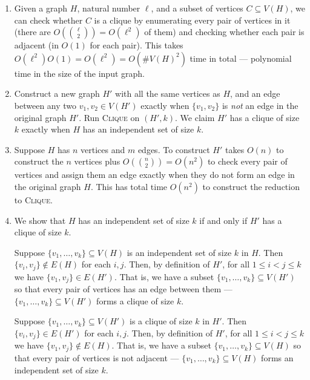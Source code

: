 \documentclass[12 pt, letterpaper]{hmcpset}
\begin{document}
\begin{solution}
	\begin{enumerate}
		\item Given a graph $H$, natural number $\ell$, and a subset of vertices $C \subseteq V(H)$, we can check whether $C$ is a clique by enumerating every pair of vertices in it (there are $O(\binom{\ell}{2}) = O(\ell^{2})$ of them) and checking whether each pair is adjacent (in $O(1)$ for each pair). This takes $O(\ell^{2}) O(1) = O(\ell^{2}) = O(\# V(H)^{2})$ time in total --- polynomial time in the size of the input graph.

		\item Construct a new graph $H'$ with all the same vertices as $H$, and an edge between any two $v_{1}, v_{2} \in V(H')$ exactly when $\{v_{1}, v_{2}\}$ is \emph{not} an edge in the original graph $H'$. Run \textsc{Clique} on $(H', k)$. We claim $H'$ has a clique of size $k$ exactly when $H$ has an independent set of size $k$.

		\item Suppose $H$ has $n$ vertices and $m$ edges. To construct $H'$ takes $O(n)$ to construct the $n$ vertices plus $O(\binom{n}{2}) = O(n^{2})$ to check every pair of vertices and assign them an edge exactly when they do not form an edge in the original graph $H$. This has total time $O(n^{2})$ to construct the reduction to \textsc{Clique}.

		\item We show that $H$ has an independent set of size $k$ if and only if $H'$ has a clique of size $k$. 

			Suppose $\{ v_{1}, \dots, v_{k} \} \subseteq V(H)$ is an independent set of size $k$ in $H$. Then $\{ v_{i}, v_{j} \} \notin E(H)$ for each $i, j$. Then, by definition of $H'$, for all $1 \le i < j \le k$ we have $\{ v_{1}, v_{j} \} \in E(H')$. That is, we have a subset $\{ v_{1}, \dots, v_{k} \} \subseteq V(H')$ so that every pair of vertices has an edge between them --- $\{ v_{1}, \dots, v_{k} \} \subseteq V(H')$ forms a clique of size $k$.

			Suppose $\{ v_{1}, \dots, v_{k} \} \subseteq V(H')$ is a clique of size $k$ in $H'$. Then $\{ v_{i}, v_{j} \} \in E(H')$ for each $i, j$. Then, by definition of $H'$, for all $1 \le i < j \le k$ we have $\{ v_{1}, v_{j} \} \notin E(H)$. That is, we have a subset $\{ v_{1}, \dots, v_{k} \} \subseteq V(H)$ so that every pair of vertices is not adjacent --- $\{ v_{1}, \dots, v_{k} \} \subseteq V(H)$ forms an independent set of size $k$.


\end{enumerate}
\end{solution}
\end{document}
